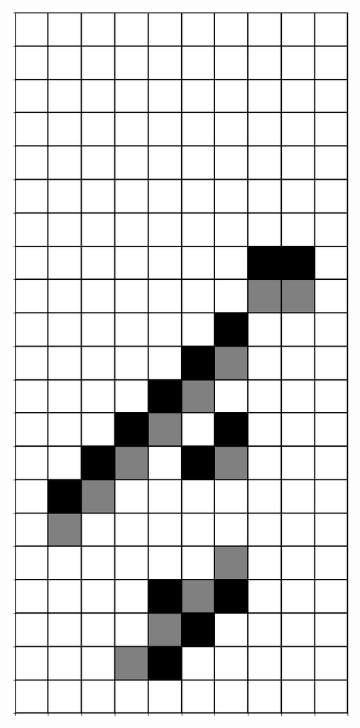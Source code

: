 \documentclass[12pt]{article}
\numberwithin{figure}{section} %
\begin{document}
\begin{figure}[H]
\begin{subfigure}{0.3\textwidth}
     \subcaption{}
   \end{subfigure}
        \begin{subfigure}{0.3\textwidth}
     \centering
     \includegraphics[angle=270,width=\linewidth]{Section4/23.2}

\end{subfigure}
\end{figure}
\end{document}
